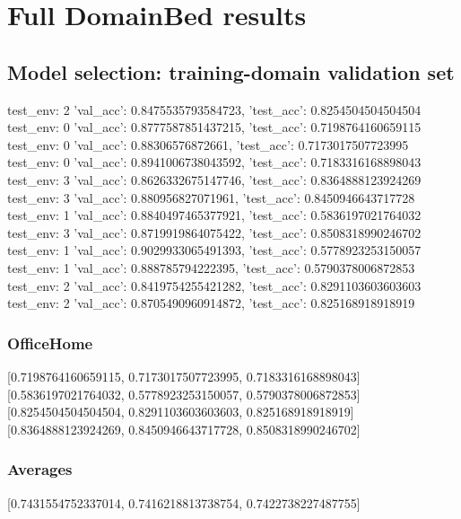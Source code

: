 \documentclass{article}
\begin{document}
\section{Full DomainBed results}

\subsection{Model selection: training-domain validation set}
test_env: 2
{'val_acc': 0.8475535793584723, 'test_acc': 0.8254504504504504}
test_env: 0
{'val_acc': 0.8777587851437215, 'test_acc': 0.7198764160659115}
test_env: 0
{'val_acc': 0.88306576872661, 'test_acc': 0.7173017507723995}
test_env: 0
{'val_acc': 0.8941006738043592, 'test_acc': 0.7183316168898043}
test_env: 3
{'val_acc': 0.8626332675147746, 'test_acc': 0.8364888123924269}
test_env: 3
{'val_acc': 0.880956827071961, 'test_acc': 0.8450946643717728}
test_env: 1
{'val_acc': 0.8840497465377921, 'test_acc': 0.5836197021764032}
test_env: 3
{'val_acc': 0.8719919864075422, 'test_acc': 0.8508318990246702}
test_env: 1
{'val_acc': 0.9029933065491393, 'test_acc': 0.5778923253150057}
test_env: 1
{'val_acc': 0.888785794222395, 'test_acc': 0.5790378006872853}
test_env: 2
{'val_acc': 0.8419754255421282, 'test_acc': 0.8291103603603603}
test_env: 2
{'val_acc': 0.8705490960914872, 'test_acc': 0.825168918918919}

\subsubsection{OfficeHome}
[0.7198764160659115, 0.7173017507723995, 0.7183316168898043]
[0.5836197021764032, 0.5778923253150057, 0.5790378006872853]
[0.8254504504504504, 0.8291103603603603, 0.825168918918919]
[0.8364888123924269, 0.8450946643717728, 0.8508318990246702]

\begin{center}
\end{center}

\subsubsection{Averages}
[0.7431554752337014, 0.7416218813738754, 0.7422738227487755]

\begin{center}
\end{center}
\end{document}
